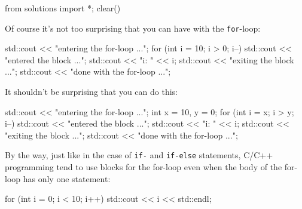 \begin{python0}
from solutions import *; clear()
\end{python0}

Of course it's not too surprising that you can have  with the \texttt{for}-loop:
\begin{console}
std::cout << "entering the for-loop ...\n";
for (int i = 10; i > 0; i--)
{
        std::cout << "entered the block ...\n";
        std::cout << "i: " << i;
        std::cout << "exiting the block ...\n";
}
std::cout << "done with the for-loop ...\n";
\end{console}

It shouldn't be surprising that you can do this:
\begin{console}
std::cout << "entering the for-loop ...\n";
int x = 10, y = 0;
for (int i = x; i > y; i--)
{
        std::cout << "entered the block ...\n";
        std::cout << "i: " << i;
        std::cout << "exiting the block ...\n";
}
std::cout << "done with the for-loop ...\n";
\end{console}

By the way, just like in the case of \texttt{if-} and \texttt{if-else} statements, C/C++ programming tend to use blocks for the for-loop even when the body of the for-loop has only one statement:
\begin{console}
for (int i = 0; i < 10; i++)
{
        std::cout << i << std::endl;
}
\end{console}




